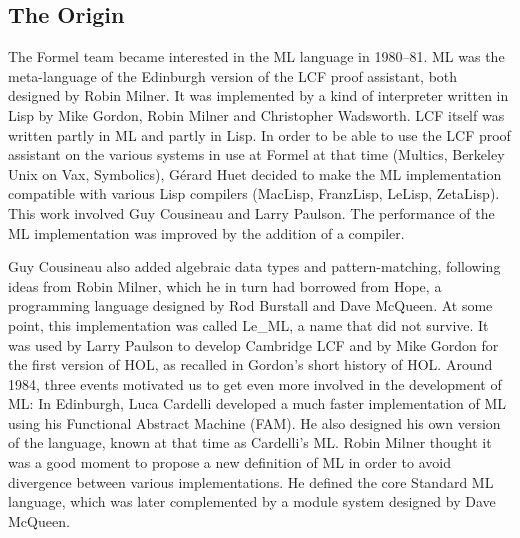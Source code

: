 \documentclass[14pt]{matmex-diploma-custom}
\begin{document}
\begin{itemize}
\begin{itemize}
\subsection{The Origin}
The Formel team became interested in the ML language in 1980–81. ML was the meta-language of the Edinburgh version of the LCF proof assistant, both designed by Robin Milner. It was implemented by a kind of interpreter written in Lisp by Mike Gordon, Robin Milner and Christopher Wadsworth. LCF itself was written partly in ML and partly in Lisp. In order to be able to use the LCF proof assistant on the various systems in use at Formel at that time (Multics, Berkeley Unix on Vax, Symbolics), Gérard Huet decided to make the ML implementation compatible with various Lisp compilers (MacLisp, FranzLisp, LeLisp, ZetaLisp). This work involved Guy Cousineau and Larry Paulson. The performance of the ML implementation was improved by the addition of a compiler.

Guy Cousineau also added algebraic data types and pattern-matching, following ideas from Robin Milner, which he in turn had borrowed from Hope, a programming language designed by Rod Burstall and Dave McQueen. At some point, this implementation was called Le\_ML, a name that did not survive. It was used by Larry Paulson to develop Cambridge LCF and by Mike Gordon for the first version of HOL, as recalled in Gordon's short history of HOL.
Around 1984, three events motivated us to get even more involved in the development of ML:
In Edinburgh, Luca Cardelli developed a much faster implementation of ML using his Functional Abstract Machine (FAM). He also designed his own version of the language, known at that time as Cardelli's ML.
Robin Milner thought it was a good moment to propose a new definition of ML in order to avoid divergence between various implementations. He defined the core Standard ML language, which was later complemented by a module system designed by Dave McQueen.


\end{itemize}
\end{itemize}
\end{document}

